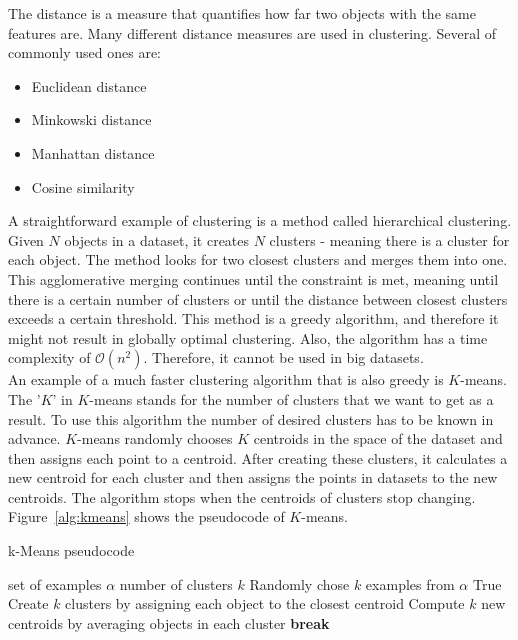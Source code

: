 \documentclass[thesis=B,english]{FITthesis}[2012/10/20]
\begin{document}
The distance is a measure that quantifies how far two objects with the same features are.
Many different distance measures are used in clustering.
Several of commonly used ones are:
\begin{itemize}
    \item Euclidean distance
    \item Minkowski distance
    \item Manhattan distance
    \item Cosine similarity
\end{itemize}  

A straightforward example of clustering is a method called hierarchical clustering.
Given $N$ objects in a dataset, it creates $N$ clusters - meaning there is a cluster for each object.
The method looks for two closest clusters and merges them into one.
This agglomerative merging continues until the constraint is met, meaning until there is a certain number of clusters or until the distance between closest clusters exceeds a certain threshold.
This method is a greedy algorithm, and therefore it might not result in globally optimal clustering.
Also, the algorithm has a time complexity of $\mathcal{O}(n^2)$.
Therefore, it cannot be used in big datasets. \\

An example of a much faster clustering algorithm that is also greedy is $K$-means. 
The '$K$' in $K$-means stands for the number of clusters that we want to get as a result.
To use this algorithm the number of desired clusters has to be known in advance.
$K$-means randomly chooses $K$ centroids in the space of the dataset and then assigns each point to a centroid.
After creating these clusters, it calculates a new centroid for each cluster and then assigns the points in datasets to the new centroids.
The algorithm stops when the centroids of clusters stop changing.
Figure~\ref{alg:kmeans} shows the pseudocode of $K$-means.
\begin{algorithm}\label{alg:kmeans}
    \caption{k-Means pseudocode}
    \label{k_mean_pseudocode}
    \begin{algorithmic}[1]
        \INPUT set of examples $\alpha$  number of clusters $k$
        \STATE Randomly chose $k$ examples from $\alpha$
        \WHILE True
            \STATE Create $k$ clusters by assigning each object to the closest centroid
            \STATE Compute $k$ new centroids by averaging objects in each cluster
                \STATE \textbf{break}
            \ENDIF
        \ENDWHILE
    \end{algorithmic}
\end{algorithm}
\end{document}
